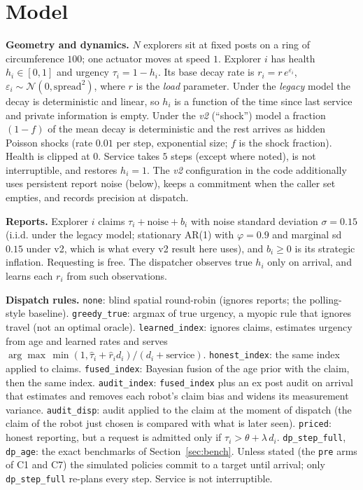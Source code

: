 \documentclass[10pt]{article}
\begin{document}
\section{Model}
\textbf{Geometry and dynamics.} $N$ explorers sit at fixed posts on a ring of circumference $100$; one actuator moves at speed $1$. Explorer $i$ has health $h_i\in[0,1]$ and urgency $\tau_i=1-h_i$. Its base decay rate is $r_i=r\,e^{\varepsilon_i}$, $\varepsilon_i\sim\mathcal N(0,\text{spread}^2)$, where $r$ is the \emph{load} parameter. Under the \emph{legacy} model the decay is deterministic and linear, so $h_i$ is a function of the time since last service and private information is empty. Under the \emph{v2} (``shock'') model a fraction $(1-f)$ of the mean decay is deterministic and the rest arrives as hidden Poisson shocks (rate $0.01$ per step, exponential size; $f$ is the shock fraction). Health is clipped at $0$. Service takes $5$ steps (except where noted), is not interruptible, and restores $h_i=1$. The \emph{v2} configuration in the code additionally uses persistent report noise (below), keeps a commitment when the caller set empties, and records precision at dispatch.

\textbf{Reports.} Explorer $i$ claims $\tau_i+\text{noise}+b_i$ with noise standard deviation $\sigma=0.15$ (i.i.d. under the legacy model; stationary AR(1) with $\varphi=0.9$ and marginal sd $0.15$ under v2, which is what every v2 result here uses), and $b_i\ge0$ is its strategic inflation. Requesting is free. The dispatcher observes true $h_i$ only on arrival, and learns each $r_i$ from such observations.

\textbf{Dispatch rules.} \texttt{none}: blind spatial round-robin (ignores reports; the polling-style baseline). \texttt{greedy\_true}: argmax of true urgency, a myopic rule that ignores travel (not an optimal oracle). \texttt{learned\_index}: ignores claims, estimates urgency from age and learned rates and serves $\arg\max\, \min(1,\hat\tau_i+\hat r_i d_i)/(d_i+\text{service})$. \texttt{honest\_index}: the same index applied to claims. \texttt{fused\_index}: Bayesian fusion of the age prior with the claim, then the same index. \texttt{audit\_index}: \texttt{fused\_index} plus an ex post audit on arrival that estimates and removes each robot's claim bias and widens its measurement variance. \texttt{audit\_disp}: audit applied to the claim at the moment of dispatch (the claim of the robot just chosen is compared with what is later seen). \texttt{priced}: honest reporting, but a request is admitted only if $\tau_i>\theta+\lambda\,d_i$. \texttt{dp\_step\_full}, \texttt{dp\_age}: the exact benchmarks of Section~\ref{sec:bench}. Unless stated (the \texttt{pre} arms of C1 and C7) the simulated policies commit to a target until arrival; only \texttt{dp\_step\_full} re-plans every step. Service is not interruptible.
\end{document}
